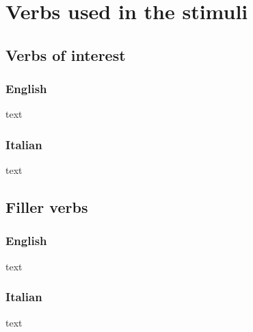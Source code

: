 \setchapterpreamble[u]{\margintoc}
\chapter{Verbs used in the stimuli}

\section{Verbs of interest}

\subsection{English}

text 

\subsection{Italian}

text 


\section{Filler verbs}

\subsection{English}

text 

\subsection{Italian}

text 